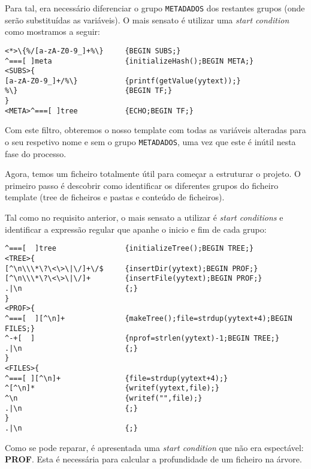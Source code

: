 \documentclass[12pt]{article}
\begin{document}
Para tal, era necessário diferenciar o grupo \texttt{METADADOS} dos restantes grupos (onde serão substituídas as variáveis). O mais sensato é utilizar uma \textit{start condition} como mostramos a seguir:

\vspace{0.5cm}
\begin{tcolorbox}
\begin{verbatim}
<*>\{%/[a-zA-Z0-9_]+%\}     {BEGIN SUBS;}
^===[ ]meta                 {initializeHash();BEGIN META;}
<SUBS>{
[a-zA-Z0-9_]+/%\}           {printf(getValue(yytext));}
%\}                         {BEGIN TF;}
}
<META>^===[ ]tree           {ECHO;BEGIN TF;}
\end{verbatim}
\end{tcolorbox}

Com este filtro, obteremos o nosso template com todas as variáveis alteradas para o seu respetivo nome e sem o grupo \texttt{METADADOS}, uma vez que este é inútil nesta fase do processo.

Agora, temos um ficheiro totalmente útil para começar a estruturar o projeto. O primeiro passo é descobrir como identificar os diferentes grupos do ficheiro template (tree de ficheiros e pastas e conteúdo de ficheiros).

Tal como no requisito anterior, o mais sensato a utilizar é \textit{start conditions} e identificar a expressão regular que apanhe o inicio e fim de cada grupo:


\begin{tcolorbox}
\begin{verbatim}
^===[  ]tree                {initializeTree();BEGIN TREE;}
<TREE>{
[^\n\\\*\?\<\>\|\/]+\/$     {insertDir(yytext);BEGIN PROF;}
[^\n\\\*\?\<\>\|\/]+        {insertFile(yytext);BEGIN PROF;}
.|\n                        {;}
}
<PROF>{
^===[  ][^\n]+              {makeTree();file=strdup(yytext+4);BEGIN FILES;}
^-+[  ]                     {nprof=strlen(yytext)-1;BEGIN TREE;}
.|\n                        {;}
}
<FILES>{
^===[ ][^\n]+               {file=strdup(yytext+4);}
^[^\n]*                     {writef(yytext,file);}
^\n                         {writef("",file);}
.|\n                        {;}
}
.|\n                        {;}

\end{verbatim}
\end{tcolorbox}

Como se pode reparar, é apresentada uma \textit{start condition} que não era espectável: \textbf{PROF}. Esta é necessária para calcular a profundidade de um ficheiro na árvore.
\end{document}
